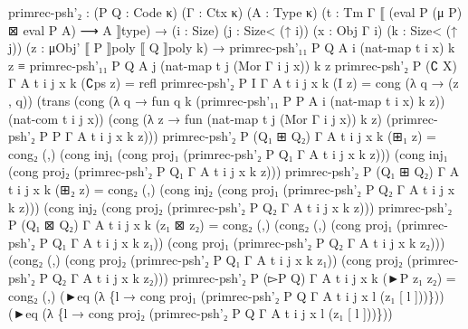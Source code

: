 {\begin{code}
{primrec{-}psh'₂ : (P Q : Code κ) (Γ : Ctx κ) (A : Type κ) (t : Tm Γ ⟦ (eval P (μ P) ⊠ eval P A) ⟶ A ⟧type)
  → (i : Size) (j : Size< (↑ i)) (x : Obj Γ i) (k : Size< (↑ j)) (z : μObj' ⟦ P ⟧poly ⟦ Q ⟧poly k)
  → primrec{-}psh'₁₁ P Q A i (nat{-}map t i x) k z
    ≡
    primrec{-}psh'₁₁ P Q A j (nat{-}map t j (Mor Γ i j x)) k z
primrec{-}psh'₂ P (∁ X) Γ A t i j x k (∁ps z) = refl
primrec{-}psh'₂ P I Γ A t i j x k (I z) =
  cong (λ q → (z , q))
       (trans (cong (λ q → fun q k (primrec{-}psh'₁₁ P P A i (nat{-}map t i x) k z)) (nat{-}com t i j x))
              (cong (λ z → fun (nat{-}map t j (Mor Γ i j x)) k z) (primrec{-}psh'₂ P P Γ A t i j x k z)))
primrec{-}psh'₂ P (Q₁ ⊞ Q₂) Γ A t i j x k (⊞₁ z) =
  cong₂ (\AgdaUnderscore{},\AgdaUnderscore{})
        (cong inj₁ (cong proj₁ (primrec{-}psh'₂ P Q₁ Γ A t i j x k z)))
        (cong inj₁ (cong proj₂ (primrec{-}psh'₂ P Q₁ Γ A t i j x k z)))
primrec{-}psh'₂ P (Q₁ ⊞ Q₂) Γ A t i j x k (⊞₂ z) =
  cong₂ (\AgdaUnderscore{},\AgdaUnderscore{})
        (cong inj₂ (cong proj₁ (primrec{-}psh'₂ P Q₂ Γ A t i j x k z)))
        (cong inj₂ (cong proj₂ (primrec{-}psh'₂ P Q₂ Γ A t i j x k z)))
primrec{-}psh'₂ P (Q₁ ⊠ Q₂) Γ A t i j x k (z₁ ⊠ z₂) =
  cong₂ (\AgdaUnderscore{},\AgdaUnderscore{})
        (cong₂ (\AgdaUnderscore{},\AgdaUnderscore{})
               (cong proj₁ (primrec{-}psh'₂ P Q₁ Γ A t i j x k z₁))
               (cong proj₁ (primrec{-}psh'₂ P Q₂ Γ A t i j x k z₂)))
        (cong₂ (\AgdaUnderscore{},\AgdaUnderscore{})
               (cong proj₂ (primrec{-}psh'₂ P Q₁ Γ A t i j x k z₁))
               (cong proj₂ (primrec{-}psh'₂ P Q₂ Γ A t i j x k z₂)))
primrec{-}psh'₂ P (▻P Q) Γ A t i j x k (►P z₁ z₂) =
  cong₂ (\AgdaUnderscore{},\AgdaUnderscore{})
        (►eq (λ \{l → cong proj₁ (primrec{-}psh'₂ P Q Γ A t i j x l (z₁ [ l ]))\}))
        (►eq (λ \{l → cong proj₂ (primrec{-}psh'₂ P Q Γ A t i j x l (z₁ [ l ]))\}))

}
\end{code}}
